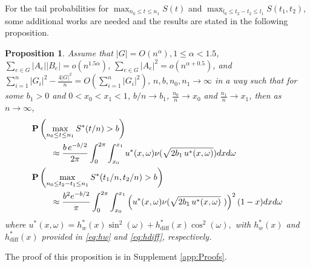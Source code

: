 \documentclass[arxiv, preprint]{imsart}
\numberwithin{equation}{section}
\theoremstyle{plain}
\newtheorem{proposition}[thm]{Proposition}
\begin{document}
For the tail probabilities for $\max_{n_0 \le t \le n_1} S(t)$ and $\max_{l_0 \le t_2 - t_2 \le l_1} S(t_1,t_2)$, some additional works are needed and the results are stated in the following proposition.   
\begin{proposition}
\label{thm:S_pvalue_approx} Assume that  $|G| = O(n^\alpha), 1 \le \alpha < 1.5$, $\sum_{e \in G} |A_e||B_e| = o(n^{1.5 \alpha})$, 
$\sum_{e \in G} |A_e|^2 = o(n^{\alpha+0.5})$, and $\sum_{i=1}^n |G_i|^2 - \tfrac{4|G|^2}{n} = O(\sum_{i=1}^n |G_i|^2)$, $n,b,n_0,n_1 \rightarrow \infty$ in a way such that for some $b_1>0$ and $0<x_0<x_1<1$, $b/n\rightarrow b_1$, $\tfrac{n_0}{n}\rightarrow x_0$ and $\tfrac{n_1}{n}\rightarrow x_1$, 
then as $n \rightarrow \infty$,
\begin{align}
\mathbf{P} & \left(\max_{n_0 \le t \le n_1} S^*(t/n) > b \right) \\
& \hspace{5mm}  \approx \frac{b\,e^{-b/2}}{2\pi}  \int_{0}^{2 \pi} \int_{x_0}^{x_1} u^*(x,\omega) \nu (\sqrt{2 b_1 \, u^*(x,\omega)}) dx d \omega \nonumber \\
\mathbf{P} & \left (\max_{n_0 \le t_2 - t_1 \le n_1} S^*(t_1/n, t_2/n) > b \right)   \\
& \hspace{5mm} \approx \frac{b^2 e^{-b/2}}{\pi}  \int_{0}^{2 \pi} \int_{x_0}^{x_1} \left( u^*(x,\omega)   \nu(\sqrt{2b_1 \, u^*(x,\omega)}\, \, ) \right)^2 (1-x) dx d\omega   \nonumber
\end{align}
where 
$ u^*(x,\omega) =  h_w^*(x)\sin^2(\omega) + h_\text{diff}^*(x)\cos^2(\omega),$
with $h^*_w(x)$ and $h^*_{\text{diff}}(x)$ provided in \eqref{eq:hw} and \eqref{eq:hdiff}, respectively.
\end{proposition}
The proof of this proposition is in Supplement \ref{app:Proofs}. 
\end{document}
